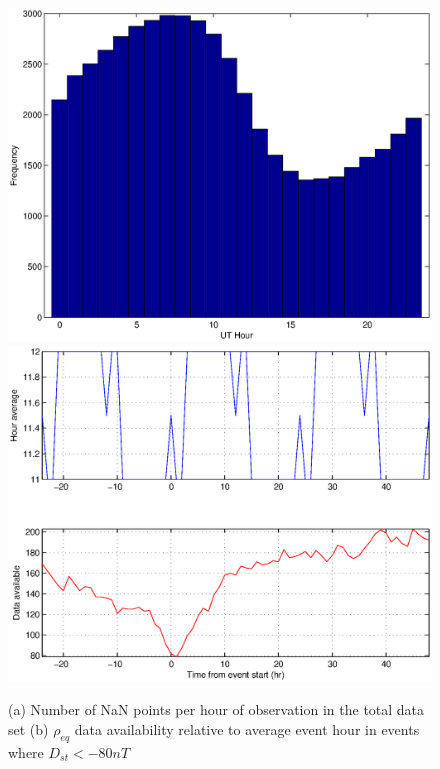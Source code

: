 \documentclass[10pt,twocolumn]{article}
\begin{document}
\begin{figure}[htp]
\centering
\includegraphics[scale=0.5]{paperfigures/nansbyhour.eps}
\includegraphics[scale=0.5]{paperfigures/nansbyhour_storm.eps}
\caption{(a) Number of NaN points per hour of observation in the total data set (b) $\rho_{eq}$ data availability relative to average event hour in events where $D_{st}<-80nT$}
\label{nanperhour}
\end{figure}
\clearpage
\end{document}
